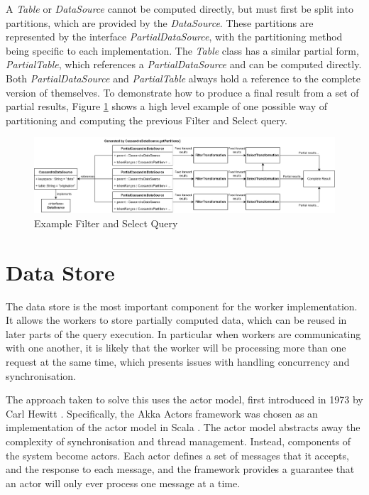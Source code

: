 A \textit{Table} or \textit{DataSource} cannot be computed directly, but must first be split into partitions, which are provided by the \textit{DataSource}. These partitions are represented by the interface \textit{PartialDataSource}, with the partitioning method being specific to each implementation. The \textit{Table} class has a similar partial form, \textit{PartialTable}, which references a \textit{PartialDataSource} and can be computed directly. Both \textit{PartialDataSource} and \textit{PartialTable} always hold a reference to the complete version of themselves. To demonstrate how to produce a final result from a set of partial results, Figure \ref{fig:partial-filter-select-query} shows a high level example of one possible way of partitioning and computing the previous Filter and Select query.

\begin{figure}[h]
	\centering
	\includegraphics[width=\textwidth]{chapters/diagrams/implementation/partial-filter-select-query}
	\caption{Example Filter and Select Query}
	\label{fig:partial-filter-select-query}
\end{figure}



\section{Data Store}
The data store is the most important component for the worker implementation. It allows the workers to store partially computed data, which can be reused in later parts of the query execution. In particular when workers are communicating with one another, it is likely that the worker will be processing more than one request at the same time, which presents issues with handling concurrency and synchronisation.

The approach taken to solve this uses the actor model, first introduced in 1973 by Carl Hewitt \cite{hewitt1973session}. Specifically, the Akka Actors framework was chosen as an implementation of the actor model in Scala \cite{akkaactors}. The actor model abstracts away the complexity of synchronisation and thread management. Instead, components of the system become actors. Each actor defines a set of messages that it accepts, and the response to each message, and the framework provides a guarantee that an actor will only ever process one message at a time.

